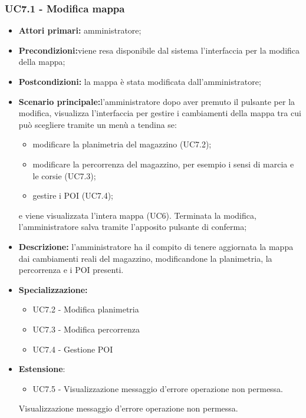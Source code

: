 \subsubsection{UC7.1 - Modifica mappa}
\begin{itemize}
	\item 	\textbf{Attori primari:} amministratore;
	\item 	\textbf{Precondizioni:}viene resa disponibile dal sistema l’interfaccia per la modifica della mappa;
	\item 	\textbf{Postcondizioni:} la mappa è stata modificata dall’amministratore;
	\item 	\textbf{Scenario principale:}l’amministratore dopo aver premuto il pulsante per la modifica, visualizza l’interfaccia per gestire i cambiamenti della mappa tra cui può scegliere tramite un menù a tendina se:
	\begin{itemize}
		\item modificare la planimetria del magazzino (UC7.2);
		\item modificare la percorrenza del magazzino, per esempio i sensi di marcia e le corsie (UC7.3);
		\item gestire i POI (UC7.4);
	\end{itemize}
	e viene visualizzata l’intera mappa (UC6).
Terminata la modifica, l’amministratore salva tramite l’apposito pulsante di conferma;
	\item 	\textbf{Descrizione:} l’amministratore ha il compito di tenere aggiornata la mappa dai cambiamenti reali del magazzino, modificandone la planimetria, la percorrenza e i POI presenti.
	\item 	\textbf{Specializzazione:} 
	\begin{itemize}
		\item UC7.2 - Modifica planimetria
		\item UC7.3 - Modifica percorrenza
		\item UC7.4 - Gestione POI
	\end{itemize}
	\item \textbf{Estensione}:
	\begin{itemize}
		\item UC7.5 - Visualizzazione messaggio d’errore operazione non permessa.
	\end{itemize}Visualizzazione messaggio d’errore operazione non permessa.
\end{itemize}


